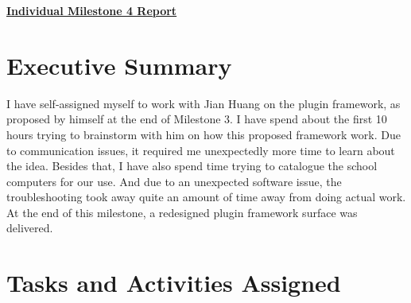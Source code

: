 \documentclass{article}
\begin{document}
\pagestyle{headings}

\begin{center}
{\LARGE\textbf{\underline{{Individual Milestone 4 Report}}}}
\end{center}

\section*{Executive Summary}

I have self-assigned myself to work with Jian Huang on the plugin framework, as proposed by himself at the end of Milestone 3. I have spend about the first 10 hours trying to brainstorm with him on how this proposed framework work. Due to communication issues, it required me unexpectedly more time to learn about the idea. Besides that, I have also spend time trying to catalogue the school computers for our use. And due to an unexpected software issue, the troubleshooting took away quite an amount of time away from doing actual work. At the end of this milestone, a redesigned plugin framework surface was delivered. 

\section*{Tasks and Activities Assigned}
\end{document}
